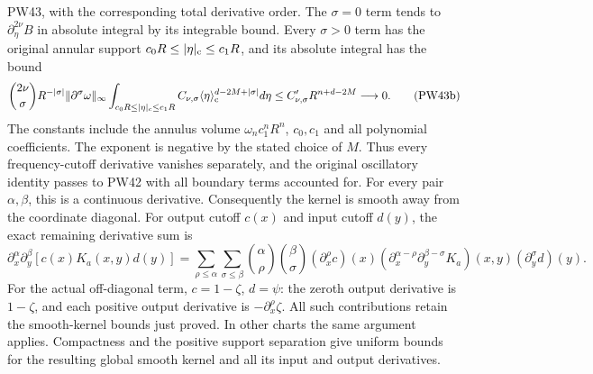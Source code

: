 \documentclass[
  11pt,
]{article}
\begin{document}
PW43, with the corresponding total derivative order. The \(\sigma=0\)
term tends to \(\partial_\eta^{2\nu}B\) in absolute integral by its
integrable bound. Every \(\sigma>0\) term has the original annular
support \(c_0R\leq|\eta|_{\rm c}\leq c_1R\), and its absolute integral
has the bound \[
 {2\nu\choose\sigma}R^{-|\sigma|}
 \|\partial^\sigma\omega\|_\infty
 \int_{c_0R\leq|\eta|_{\rm c}\leq c_1R}
    C_{\nu,\sigma}\langle\eta\rangle_{\rm c}^{d-2M+|\sigma|}d\eta
 \leq C'_{\nu,\sigma}R^{n+d-2M}\longrightarrow0.
 \tag{PW43b}
\] The constants include the annulus volume \(\omega_nc_1^nR^n\),
\(c_0,c_1\) and all polynomial coefficients. The exponent is negative by
the stated choice of \(M\). Thus every frequency-cutoff derivative
vanishes separately, and the original oscillatory identity passes to
PW42 with all boundary terms accounted for. For every pair
\(\alpha,\beta\), this is a continuous derivative. Consequently the
kernel is smooth away from the coordinate diagonal. For output cutoff
\(c(x)\) and input cutoff \(d(y)\), the exact remaining derivative sum
is \[
 \partial_x^\alpha\partial_y^\beta[c(x)K_a(x,y)d(y)]
 =\sum_{\rho\leq\alpha}\sum_{\sigma\leq\beta}
     {\alpha\choose\rho}{\beta\choose\sigma}
     (\partial_x^\rho c)(x)
     (\partial_x^{\alpha-\rho}\partial_y^{\beta-\sigma}K_a)(x,y)
     (\partial_y^\sigma d)(y).
 \tag{PW43c}
\] For the actual off-diagonal term, \(c=1-\zeta\), \(d=\psi\): the
zeroth output derivative is \(1-\zeta\), and each positive output
derivative is \(-\partial_x^\rho\zeta\). All such contributions retain
the smooth-kernel bounds just proved. In other charts the same argument
applies. Compactness and the positive support separation give uniform
bounds for the resulting global smooth kernel and all its input and
output derivatives.
\end{document}
